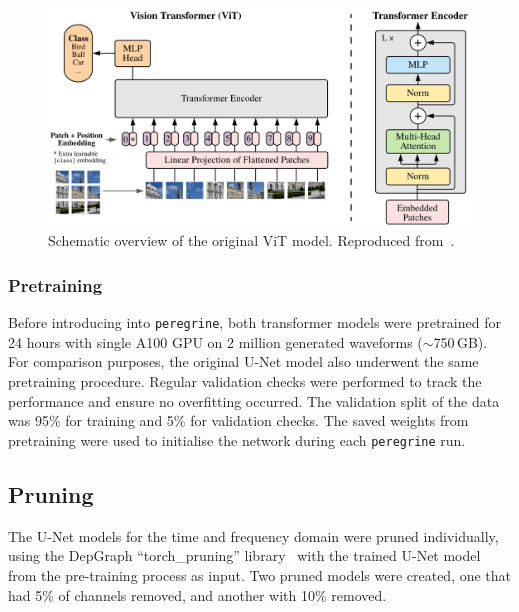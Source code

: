 \begin{figure}[htb]
  \centering
  \includegraphics[width=1\linewidth]{media/images/ViTmodel.PNG}
  \caption{Schematic overview of the original ViT model. Reproduced from~\cite{Vaswani_2017_transformer}.}
  \label{fig:vit_model_architecure}
  \myvspacecommand
\end{figure}

\subsubsection{Pretraining}

Before introducing into \texttt{peregrine}, both transformer models were pretrained for 24 hours with single A100 GPU on 2 million generated waveforms ($\sim$750\,GB). For comparison purposes, the original U-Net model also underwent the same pretraining procedure. Regular validation checks were performed to track the performance and ensure no overfitting occurred. The validation split of the data was 95\% for training and 5\% for validation checks. The saved weights from pretraining were used to initialise the network during each \texttt{peregrine} run. 

\subsection{Pruning}

The U-Net models for the time and frequency domain were pruned individually, using the DepGraph \enquote{torch\_pruning} library~\cite{Fang_Ma_Song_Mi_Wang_2023} with the trained U-Net model from the pre-training process as input. Two pruned models were created, one that had 5\% of channels removed, and another with 10\% removed.


